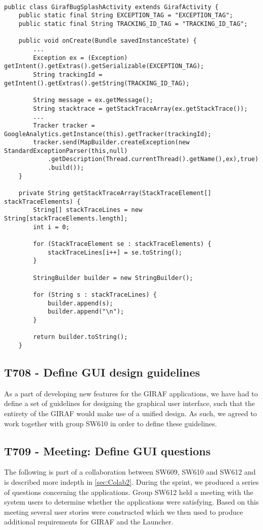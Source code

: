 \begin{minipage}[H]{\linewidth}
\begin{lstlisting}[caption = Our approach to outputting the stack trace, label = BugOurSol]

public class GirafBugSplashActivity extends GirafActivity {
	public static final String EXCEPTION_TAG = "EXCEPTION_TAG";
    public static final String TRACKING_ID_TAG = "TRACKING_ID_TAG";
    
	public void onCreate(Bundle savedInstanceState) {
		...
		Exception ex = (Exception) getIntent().getExtras().getSerializable(EXCEPTION_TAG); 
		String trackingId = getIntent().getExtras().getString(TRACKING_ID_TAG);
		
		String message = ex.getMessage();
        String stacktrace = getStackTraceArray(ex.getStackTrace());
        ...
        Tracker tracker = GoogleAnalytics.getInstance(this).getTracker(trackingId);
        tracker.send(MapBuilder.createException(new StandardExceptionParser(this,null)
            .getDescription(Thread.currentThread().getName(),ex),true)
            .build());
    }

	private String getStackTraceArray(StackTraceElement[] stackTraceElements) {
        String[] stackTraceLines = new String[stackTraceElements.length];
        int i = 0;
        
        for (StackTraceElement se : stackTraceElements) {
            stackTraceLines[i++] = se.toString();
        }
        
        StringBuilder builder = new StringBuilder();
        
        for (String s : stackTraceLines) {
            builder.append(s);
            builder.append("\n");
        }
        
        return builder.toString();
    }
\end{lstlisting}
\end{minipage}

\subsection{T708 - Define GUI design guidelines}
As a part of developing new features for the GIRAF applications, we have had to
define a set of guidelines for designing the graphical user interface, such that
the entirety of the GIRAF would make use of a unified design. As such, we agreed
to work together with group SW610 in order to define these guidelines.

\subsection{T709 - Meeting: Define GUI questions}
The following is part of a collaboration between SW609, SW610 and SW612 and is
described more indepth in \autoref{sec:Colab2}. During the sprint, we
produced a series of questions concerning the applications. Group SW612
held a meeting with the system users to determine whether the applications were
satisfying. Based on this meeting several user stories were constructed which
we then used to produce additional requirements for GIRAF and the Launcher.

